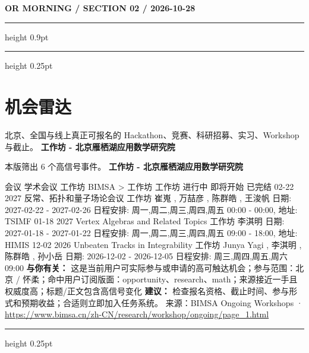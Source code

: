 \documentclass[10.5pt]{ctexart}
\begin{document}
\newpage
{\small\bfseries OR MORNING / SECTION 02 / 2026-10-28}
\vspace{2mm}
\hrule height 0.9pt
\vspace{1.5mm}
\hrule height 0.25pt
\vspace{4mm}
\section*{机会雷达}
{\color{ormuted} 北京、全国与线上真正可报名的 Hackathon、竞赛、科研招募、实习、Workshop 与截止。}
\vspace{2mm}
{\LARGE\bfseries 工作坊 - 北京雁栖湖应用数学研究院}\par
\vspace{1mm}
{\color{ormuted} 本版筛出 6 个高信号事件。}
\vspace{3mm}
{\Large\bfseries 工作坊 - 北京雁栖湖应用数学研究院}\par
会议 学术会议 工作坊 BIMSA > 工作坊 工作坊 进行中 即将开始 已完结 02-22 2027 反常、拓扑和量子场论会议 工作坊 崔嵬 , 万喆彦 , 陈群皓 , 王浚帆 日期: 2027-02-22 - 2027-02-26 日程安排: 周一,周二,周三,周四,周五 00:00 - 00:00, 地址: TSIMF 01-18 2027 Vertex Algebras and Related Topics 工作坊 李淇明 日期: 2027-01-18 - 2027-01-22 日程安排: 周一,周二,周三,周四,周五 09:00 - 18:00, 地址: HIMIS 12-02 2026 Unbeaten Tracks in Integrability 工作坊 Junya Yagi , 李淇明 , 陈群皓 , 孙小岳 日期: 2026-12-02 - 2026-12-05 日程安排: 周三,周四,周五,周六 09:00
\textbf{与你有关：} 这是当前用户可实际参与或申请的高可触达机会；参与范围：北京 / 怀柔；命中用户订阅版面：opportunity、research、math；来源接近一手且权威度高；标题/正文包含高信号变化
\textbf{建议：} 检查报名资格、截止时间、参与形式和预期收益；合适则立即加入任务系统。
{\footnotesize\color{ormuted} 来源：BIMSA Ongoing Workshops · \url{https://www.bimsa.cn/zh-CN/research/workshop/ongoing/page_1.html}}
\vspace{4mm}
\hrule height 0.25pt
\vspace{3mm}
\end{document}
